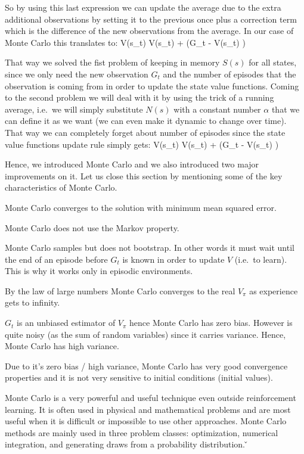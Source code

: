 \vspace{-5pt}

So by using this last expression we can update the average due to the extra additional observations by setting it to
the previous once plus a correction term which is the difference of the new observations from the average. In our
case of Monte Carlo this translates to:
\bse
V(s_t) \gets V(s_t) +  \left(G_t - V(s_t) \right)
\ese

That way we solved the fist problem of keeping in memory $S(s)$ for all states, since we only need the new
observation $G_t$ and the number of episodes that the observation is coming from in order to update the state value
functions. Coming to the second problem we will deal with it by using the trick of a running average, i.e.\ we will
simply substitute $N(s)$ with a constant number $\alpha$ that we can define it as we want (we can even make it
dynamic to change over time). That way we can completely forget about number of episodes since the state value
functions update rule simply gets:
\bse
V(s_t) \gets V(s_t) + \alpha \left(G_t - V(s_t) \right)
\ese

Hence, we introduced Monte Carlo and we also introduced two major improvements on it. Let us close this section by
mentioning some of the key characteristics of Monte Carlo.
\bit
\item Monte Carlo converges to the solution with minimum mean squared error.
\item Monte Carlo does not use the Markov property.
\item Monte Carlo samples but does not bootstrap. In other words it must wait until the end of an episode before
$G_t$ is known in order to update $V$ (i.e.\ to learn). This is why it works only in episodic environments.
\item By the law of large numbers Monte Carlo converges to the real $V_\pi$ as experience gets to infinity.
\item $G_t$ is an unbiased estimator of $V_\pi$ hence Monte Carlo has zero bias. However is quite noisy (as the sum
of random variables) since it carries variance. Hence, Monte Carlo has high variance.
\item Due to it's zero bias / high variance, Monte Carlo has very good convergence properties and it is not very
sensitive to initial conditions (initial values).
\eit

Monte Carlo is a very powerful and useful technique even outside reinforcement learning. It is often used in physical
and mathematical problems and are most useful when it is difficult or impossible to use other approaches. Monte Carlo
methods are mainly used in three problem classes: optimization, numerical integration, and generating draws from a
probability distribution. \v

